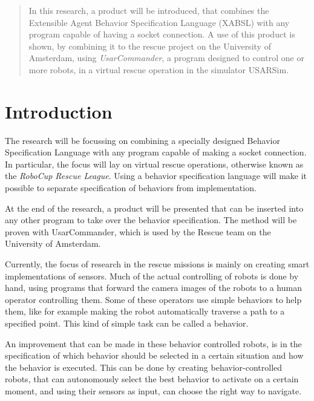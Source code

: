 \documentclass[a4paper,10pt]{article}
\begin{document}

\thispagestyle{empty}
\tableofcontents
\setcounter{page}{0}
\newpage
\begin{abstract}
In this research, a product will be introduced, that combines the Extensible
Agent Behavior Specification Language (XABSL) with any program capable of
having a socket connection. A use of this product is shown, by combining it to
the rescue project on the University of Amsterdam, using
\textit{UsarCommander},
a program designed to control one or more robots, in a virtual rescue operation
in the simulator USARSim.
\end{abstract}
\section{Introduction}
The research will be focussing on combining 
a specially designed Behavior Specification Language 
 with any program capable of making a
socket connection. In particular, the focus will lay on virtual rescue
operations, otherwise known as the \textit{RoboCup Rescue League}. Using a
behavior specification language will make it possible to separate specification
of behaviors from implementation.

At the end of the research, a product will be presented that can be inserted
into any other program to take over the behavior specification. The method will
be proven with UsarCommander, which is used by the Rescue team on the University
of Amsterdam.

Currently, the focus of research in the rescue missions is mainly on creating
smart implementations of sensors. Much of the actual controlling of robots is
done by hand, using programs that forward the camera images of the robots to a
human operator controlling them. Some of these operators use simple behaviors to
help them, like for example making the robot automatically traverse a path to a
specified point. This kind of simple task can be called a behavior.

An improvement that can be made in these behavior controlled robots, is in 
the specification of which behavior should be selected in a certain situation
and how the behavior is executed. This can be done by creating
behavior-controlled robots, that can autonomously select the best behavior to
activate on a certain moment, and using their sensors as input, can choose the
right way to navigate.
\end{document}
